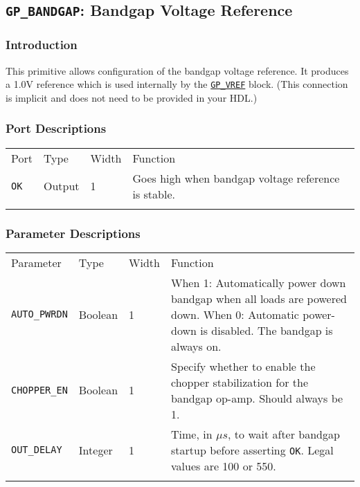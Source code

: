\documentclass[11pt]{article}
\newcommand{\tokenstyle}[1]{\texttt{#1}}
\newcommand{\whenstyle}[1]{{\fontseries{sb}\selectfont#1}}
\newcommand{\tokenref}[2]{\hyperref[#2]{\tokenstyle{#1}}}
\newcommand{\thinhline}{\Xhline{1\arrayrulewidth}}
\newcommand{\thickhline}{\Xhline{2.5\arrayrulewidth}}
\begin{document}
\pagebreak
\clearpage
\subsection{\tokenstyle{GP\_BANDGAP}: Bandgap Voltage Reference}

\subsubsection{Introduction}
This primitive allows configuration of the bandgap voltage reference. It produces a 1.0V reference which is used
internally by the \tokenref{GP\_VREF}{gp-vref} block. (This connection is implicit and does not need to be provided in
your HDL.)

\subsubsection{Port Descriptions}

\begin{tabularx}{\textwidth}{lllX}
\thinhline
\whenstyle{Port} & \whenstyle{Type} & \whenstyle{Width} & \whenstyle{Function} \\
\thickhline
\tokenstyle{OK} & Output & 1 & Goes high when bandgap voltage reference is stable. \\
\thinhline
\end{tabularx}

\subsubsection{Parameter Descriptions}

\begin{tabularx}{\textwidth}{lllX}
\thinhline
\whenstyle{Parameter} & \whenstyle{Type} & \whenstyle{Width} & \whenstyle{Function} \\
\thickhline
\tokenstyle{AUTO\_PWRDN} & Boolean & 1 &
	\whenstyle{When 1:} Automatically power down bandgap when all loads are powered down. \newline
	\whenstyle{When 0:} Automatic power-down is disabled. \newline The bandgap is always on.\\
\thinhline
\tokenstyle{CHOPPER\_EN} & Boolean & 1 &
	Specify whether to enable the chopper stabilization for the bandgap op-amp. Should always be 1. \\
\thinhline
\tokenstyle{OUT\_DELAY} & Integer & 1 &
	Time, in $\mu s$, to wait after bandgap startup before asserting \tokenstyle{OK}. Legal values are 100 or 550.\\
\thinhline
\end{tabularx}
\end{document}
